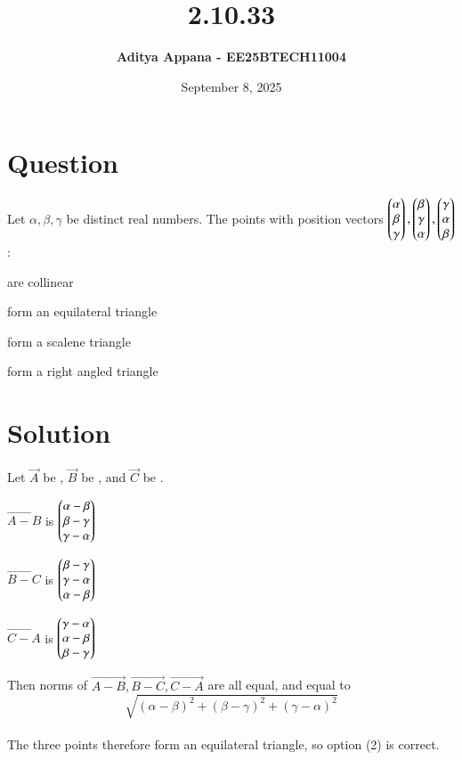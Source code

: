 \documentclass[12pt]{article}
\title{\textbf{2.10.33}}
\author{\textbf{Aditya Appana - EE25BTECH11004 }}
\date{September 8, 2025}
\begin{document}
\maketitle

\section*{Question}

Let $\alpha , \beta, \gamma$ be distinct real numbers. The points with position vectors $\begin{pmatrix}\alpha \\ \beta \\ \gamma\end{pmatrix} , \begin{pmatrix} \beta \\ \gamma \\ \alpha\end{pmatrix}, \begin{pmatrix}\gamma \\ \alpha \\ \beta\end{pmatrix}$ :

\begin{enumerate}\begin{multicols}{2}
    \item are collinear
    \item form an equilateral triangle
    \item form a scalene triangle
    \item form a right angled triangle
    \end{multicols}
\end{enumerate}

\section*{Solution}

Let $\vec{A}$ be \myvec{\alpha \\ \beta \\ \gamma}, $\vec{B}$ be \myvec{ \beta \\ \gamma \\ \alpha}, and $\vec{C}$ be \myvec{\gamma \\ \alpha \\ \beta}. \\



\begin{itemize} \begin{multicols}{3}
    \item $\vec{A-B}$ is $\begin{pmatrix}\alpha - \beta \\ \beta - \gamma \\ \gamma - \alpha\end{pmatrix}$
    \item $\vec{B-C}$ is $\begin{pmatrix}\beta - \gamma \\ \gamma - \alpha \\ \alpha - \beta\end{pmatrix}$
    \item $\vec{C-A}$ is $\begin{pmatrix}\gamma - \alpha \\ \alpha - \beta \\ \beta - \gamma\end{pmatrix}$
    \end{multicols}
\end{itemize}

Then norms of $\vec{A-B}, \vec{B-C}, \vec{C-A}$ are all equal, and equal to 
$$\sqrt{(\alpha - \beta)^2  + (\beta - \gamma)^2 + (\gamma - \alpha)^2}$$\\

The three points therefore form an equilateral triangle, so option (2) is correct.
\end{document}
